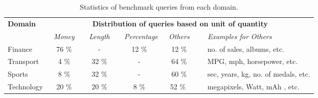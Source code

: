 
\begin{table}[t]	
	\centering
	\small
	\caption{Statistics of benchmark queries from each domain.}
	\begin{tabular}{l| c c c c l } \midrule
		\multirow{2}{*}{\textbf{Domain}} & \multicolumn{5}{c}{\textbf{Distribution of queries based on unit of quantity}} \\
		\cmidrule{2-6}
		    & \textit{~Money~} & \textit{~Length~} & \textit{~Percentage} & \textit{~Others~}~ & \textit{~Examples for Others}\\ \midrule
		Finance &  76 \% & - & 12 \% & 12 \%~   & ~no. of sales, albums, etc.\\ 
		Transport &   4 \% & 32 \% & -& 64 \%~    &~MPG, mph, horsepower, etc.  \\  
		Sports &   8 \% & 32 \% & -&60 \%~ &  ~sec, years, kg, no. of medals, etc.  \\  
		Technology &  20 \% & 20 \% & 8 \% & 52 \% ~& ~megapixels, Watt, mAh , etc. \\ \midrule 
	\end{tabular}
	\label{table:query_stat}
\end{table}